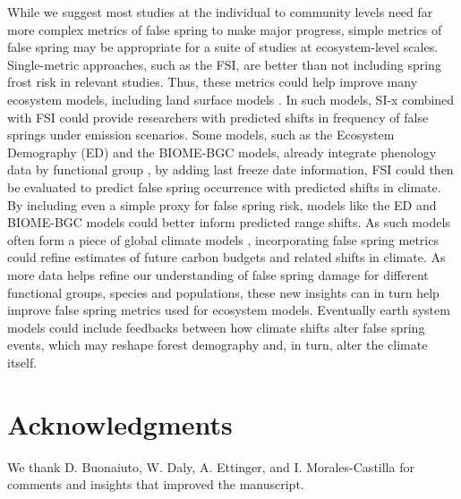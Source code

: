 \documentclass{article}\usepackage[]{graphicx}\usepackage[]{color}
\begin{document}
While we suggest most studies at the individual to community levels need far more complex metrics of false spring to make major progress, simple metrics of false spring may be appropriate for a suite of studies at ecosystem-level scales. Single-metric approaches, such as the FSI, are better than not including spring frost risk in relevant studies. Thus, these metrics could help improve many ecosystem models, including land surface models \citep{Foley1998, Moorcroft2001, Prentice1992, Thornton2005}. In such models, SI-x combined with FSI could provide researchers with predicted shifts in frequency of false springs under emission scenarios. Some models, such as the Ecosystem Demography (ED) and the BIOME-BGC models, already integrate phenology data by functional group \citep{Kim2015, Moorcroft2001, Thornton2005}, by adding last freeze date information, FSI could then be evaluated to predict false spring occurrence with predicted shifts in climate. By including even a simple proxy for false spring risk, models like the ED and BIOME-BGC models could better inform predicted range shifts. As such models often form a piece of global climate models \citep{Yu2016}, incorporating false spring metrics could refine estimates of future carbon budgets and related shifts in climate. As more data helps refine our understanding of false spring damage for different functional groups, species and populations, these new insights can in turn help improve false spring metrics used for ecosystem models. Eventually earth system models could include feedbacks between how climate shifts alter false spring events, which may reshape forest demography and, in turn, alter the climate itself.  


\section*{Acknowledgments}
We thank D. Buonaiuto,  W. Daly, A. Ettinger, and I. Morales-Castilla for comments and insights that improved the manuscript. 

\nocite{Schwartz1993}
\nocite{Barker2005}
\nocite{Sanchez2013}
\nocite{Longstroth2012}
\nocite{Barlow2015}
\nocite{Longstroth2013}
\nocite{Charrier2011}

\end{document}
